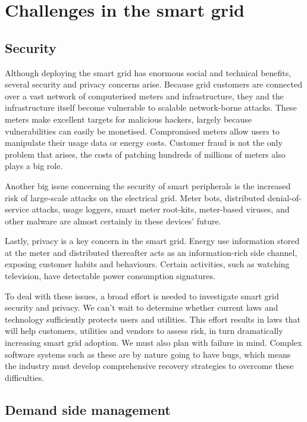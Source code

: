 \section{Challenges in the smart grid}

\subsection{Security}

Although deploying the smart grid has enormous social and technical benefits, several security and privacy concerns arise. Because grid customers are connected over a vast network of computerised meters and infrastructure, they and the infrastructure itself become vulnerable to scalable network-borne attacks. These meters make excellent targets for malicious hackers, largely because vulnerabilities can easily be monetised. Compromised meters allow users to manipulate their usage data or energy costs. Customer fraud is not the only problem that arises, the costs of patching hundreds of millions of meters also plays a big role. 

Another big issue concerning the security of smart peripherals is the increased risk of large-scale attacks on the electrical grid. Meter bots, distributed denial-of-service attacks, usage loggers, smart meter root-kits, meter-based viruses, and other malware are almost certainly in these devices’ future. 

Lastly, privacy is a key concern in the smart grid. Energy use information stored at the meter and distributed thereafter acts as an information-rich side channel, exposing customer habits and behaviours. Certain activities, such as watching television, have detectable power consumption signatures. 

To deal with these issues, a broad effort is needed to investigate smart grid security and privacy. We can’t wait to determine whether current laws and technology sufficiently protects users and utilities. This effort results in laws that will help customers, utilities and vendors to assess risk, in turn dramatically increasing smart grid adoption. We must also plan with failure in mind. Complex software systems such as these are by nature going to have bugs, which means the industry must develop comprehensive recovery strategies to overcome these difficulties. 

\subsection{Demand side management}

